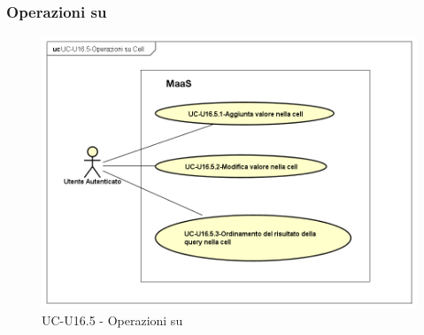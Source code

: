 \subsubsection{Operazioni su }
 

    \begin{figure}[H]
      \begin{center}
        \includegraphics[width=12cm]{res/img/UCUtenti/UCUtenteA/UC-U16.5-Operazioni_su_Cell/UC-U16.5-Operazioni_su_Cell}
      \caption{UC-U16.5 - Operazioni su }
      \end{center} 
    \end{figure}

